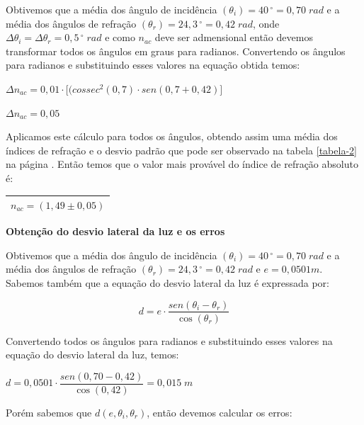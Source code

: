 \documentclass[
	12pt,				%
	oneside,			%
	a4paper,			%
	english,			%
	french,				%
	spanish,			%
	brazil				%
	]{abntex2}
\begin{document}
Obtivemos que a média dos ângulo de incidência $(\theta_i) = 40 \,^{\circ} = 0,70  \;  rad$ e a média dos ângulos de refração $(\theta_r) = 24,3 \,^{\circ} = 0,42 \; rad$, onde $\Delta \theta_i = \Delta \theta_r = 0,5 \,^{\circ} \;  rad$ e  como $n_{ac}$ deve ser admensional então devemos transformar todos os ângulos em graus para radianos. Convertendo os ângulos para radianos e substituindo esses valores na equação obtida temos:

$\Delta n_{ac} = 0,01 \cdot \lbrack(cossec^2(0,7) \cdot sen(0,7 + 0,42)\rbrack$

$\Delta n_{ac} = 0,05$

Aplicamos este cálculo para todos os ângulos, obtendo assim uma média dos índices de refração e o desvio padrão que pode ser observado na tabela \ref{tabela-2} na página \pageref{tabela-2}. Então temos que o valor mais provável do índice de refração absoluto é:

\begin{table}[!htb]
	\centering
	\begin{tabular}{|c|}
		\hline
		$ n_{ac} = (1,49 \pm 0,05)$\\
		\hline
	\end{tabular}
\end{table}
\newpage

\begin{flushleft}
\textbf{Obtenção do desvio lateral da luz e os erros}
\end{flushleft}

Obtivemos que a média dos ângulo de incidência $(\theta_i) = 40 \,^{\circ} = 0,70 \; rad$ e a média dos ângulos de refração $(\theta_r) = 24,3 \,^{\circ} = 0,42 \; rad$ e $e=0,0501 m $. Sabemos também que a  equação do desvio lateral da luz é expressada por:

$$d = e \cdot \dfrac{sen(\theta_i - \theta_r)}{\cos(\theta_r)}$$

Convertendo todos os ângulos para radianos e substituindo esses valores na equação do desvio lateral da luz, temos:

$d = 0,0501 \cdot \dfrac{sen(0,70 - 0,42)}{\cos(0,42)} = 0,015 \; m$

Porém sabemos que $d(e, \theta_i, \theta_r)$, então devemos calcular os erros:
\end{document}
